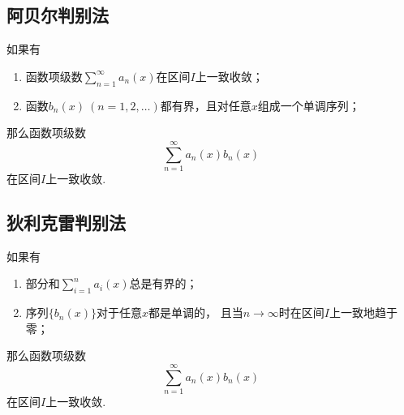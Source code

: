 \subsection{阿贝尔判别法}
\begin{theorem}[阿贝尔判别法]\label{theorem:无穷级数.阿贝尔判别法}
如果有
\begin{enumerate}
\item 函数项级数\(\sum\limits_{n=1}^\infty a_n(x)\)在区间\(I\)上一致收敛；
\item 函数\(b_n(x)\ (n=1,2,\dotsc)\)都有界，且对任意\(x\)组成一个单调序列；
\end{enumerate}
那么函数项级数\[
	\sum\limits_{n=1}^\infty a_n(x) b_n(x)
\]
在区间\(I\)上一致收敛.
\end{theorem}

\subsection{狄利克雷判别法}
\begin{theorem}[狄利克雷判别法]\label{theorem:无穷级数.狄利克雷判别法}
如果有
\begin{enumerate}
\item 部分和\(\sum\limits_{i=1}^n a_i(x)\)总是有界的；
\item 序列\(\{b_n(x)\}\)对于任意\(x\)都是单调的，
且当\(n\to\infty\)时在区间\(I\)上一致地趋于零；
\end{enumerate}
那么函数项级数\[
	\sum\limits_{n=1}^\infty a_n(x) b_n(x)
\]
在区间\(I\)上一致收敛.
\end{theorem}


